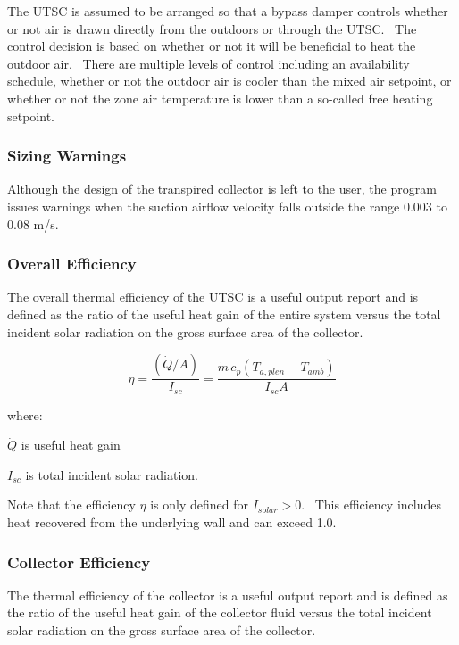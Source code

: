 The UTSC is assumed to be arranged so that a bypass damper controls whether or not air is drawn directly from the outdoors or through the UTSC.~ The control decision is based on whether or not it will be beneficial to heat the outdoor air.~ There are multiple levels of control including an availability schedule, whether or not the outdoor air is cooler than the mixed air setpoint, or whether or not the zone air temperature is lower than a so-called free heating setpoint.

\subsubsection{Sizing Warnings}\label{sizing-warnings}

Although the design of the transpired collector is left to the user, the program issues warnings when the suction airflow velocity falls outside the range 0.003 to 0.08 m/s.

\subsubsection{Overall Efficiency}\label{overall-efficiency}

The overall thermal efficiency of the UTSC is a useful output report and is defined as the ratio of the useful heat gain of the entire system versus the total incident solar radiation on the gross surface area of the collector.

\begin{equation}
\eta  = \frac{{(\dot Q/A)}}{{{I_{sc}}}} = \frac{{\dot m\,{c_p}\left( {{T_{a,plen}} - {T_{amb}}} \right)}}{{{I_{sc}}A}}
\end{equation}

where:

\(\dot Q\) is useful heat gain

\({I_{sc}}\) is total incident solar radiation.

Note that the efficiency \(\eta\) is only defined for \({I_{solar}} > 0\).~ This efficiency includes heat recovered from the underlying wall and can exceed 1.0.

\subsubsection{Collector Efficiency}\label{collector-efficiency}

The thermal efficiency of the collector is a useful output report and is defined as the ratio of the useful heat gain of the collector fluid versus the total incident solar radiation on the gross surface area of the collector.

